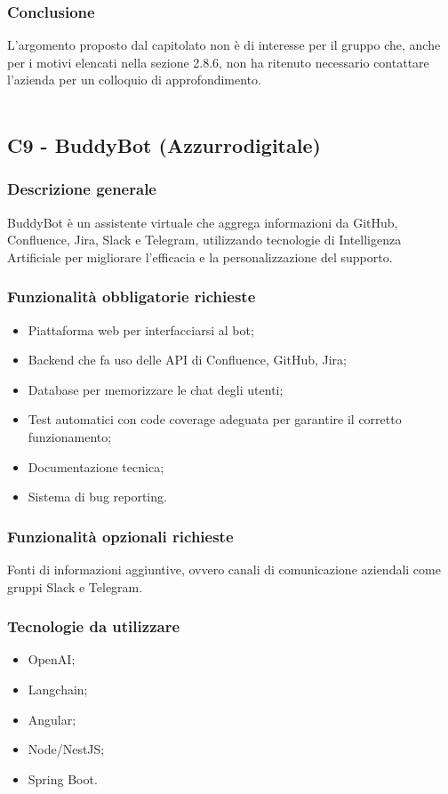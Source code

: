 \documentclass[10pt]{article}
\begin{document}
\subsubsection{Conclusione}
L'argomento proposto dal capitolato non è di interesse per il gruppo che, anche per i motivi elencati nella sezione 2.8.6, non ha ritenuto necessario contattare l'azienda per un colloquio di approfondimento.
\\\\
\subsection{C9 - BuddyBot (Azzurrodigitale)}
\subsubsection{Descrizione generale}
BuddyBot è un assistente virtuale che aggrega informazioni da GitHub, Confluence, Jira, Slack e Telegram, utilizzando tecnologie di Intelligenza Artificiale per migliorare l'efficacia e la personalizzazione del supporto.
\subsubsection{Funzionalità obbligatorie richieste}
\begin{itemize}
    \item Piattaforma web per interfacciarsi al bot;
    \item Backend che fa uso delle API di Confluence, GitHub, Jira;
    \item Database per memorizzare le chat degli utenti;
    \item Test automatici con code coverage adeguata per garantire il corretto funzionamento;
    \item Documentazione tecnica;
    \item Sistema di bug reporting.
\end{itemize}
\subsubsection{Funzionalità opzionali richieste}
    Fonti di informazioni aggiuntive, ovvero canali di comunicazione aziendali come gruppi Slack e Telegram.
\subsubsection{Tecnologie da utilizzare}
\begin{itemize}
    \item OpenAI;
    \item Langchain;
    \item Angular;
    \item Node/NestJS;
    \item Spring Boot.
\end{itemize}
\end{document}
